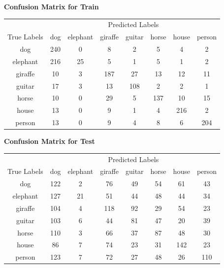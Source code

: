 \documentclass{article}
\begin{document}
\begin{center}
    \textbf{Confusion Matrix for Train}
    
    \begin{tabular}{c|ccccccc}
    \toprule
    & \multicolumn{7}{c}{Predicted Labels} \\
    \cmidrule(lr){2-8}
    True Labels & dog & elephant & giraffe & guitar & horse & house & person \\
    \midrule
    dog & 240 & 0 & 8 & 2 & 5 & 4 & 2 \\
    elephant & 216 & 25 & 5 & 1 & 5 & 1 & 2 \\
    giraffe & 10 & 3 & 187 & 27 & 13 & 12 & 11 \\
    guitar & 17 & 3 & 13 & 108 & 2 & 2 & 1 \\
    horse & 10 & 0 & 29 & 5 & 137 & 10 & 15 \\
    house & 13 & 0 & 9 & 1 & 4 & 216 & 2 \\
    person & 13 & 0 & 9 & 4 & 8 & 6 & 204 \\
    \bottomrule
    \end{tabular}
    \label{tab:confusion_matrix_train}
\end{center}

    
    
\begin{center}
    \textbf{Confusion Matrix for Test}
    
    \begin{tabular}{c|ccccccc}
    \toprule
    & \multicolumn{7}{c}{Predicted Labels} \\
    \cmidrule(lr){2-8}
    True Labels & dog & elephant & giraffe & guitar & horse & house & person \\
    \midrule
    dog & 122 & 2 & 76 & 49 & 54 & 61 & 43 \\
    elephant & 127 & 21 & 51 & 44 & 48 & 44 & 34 \\
    giraffe & 104 & 4 & 118 & 92 & 29 & 54 & 23 \\
    guitar & 103 & 6 & 44 & 81 & 47 & 20 & 39 \\
    horse & 110 & 3 & 66 & 37 & 87 & 48 & 30 \\
    house & 86 & 7 & 74 & 23 & 31 & 142 & 23 \\
    person & 123 & 7 & 72 & 27 & 48 & 26 & 110 \\
    \bottomrule
    \end{tabular}
    \label{tab:confusion_matrix_test}
\end{center}
\end{document}
